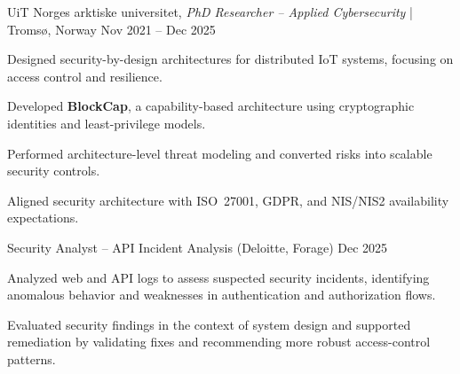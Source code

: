 


\begin{cventries2}

\cventry
  {UiT Norges arktiske universitet, \textnormal{\textit{PhD Researcher – Applied Cybersecurity} | Tromsø, Norway}}
  {Nov 2021 -- Dec 2025}
  {
    \begin{cvitems}
      \item {Designed security-by-design architectures for distributed IoT systems, focusing on access control and resilience.}
      \item {Developed \textbf{BlockCap}, a capability-based architecture using cryptographic identities and least-privilege models.}
      \item {Performed architecture-level threat modeling and converted risks into scalable security controls.}
      \item {Aligned security architecture with ISO~27001, GDPR, and NIS/NIS2 availability expectations.}
    \end{cvitems}
  }
    \vspace{3mm}

  \cventry
    {Security Analyst – API Incident Analysis (Deloitte, Forage)}
    {Dec 2025}
    {
      \begin{cvitems}
        \item {Analyzed web and API logs to assess suspected security incidents, identifying anomalous behavior and weaknesses in authentication and authorization flows.}
        \item {Evaluated security findings in the context of system design and supported remediation by validating fixes and recommending more robust access-control patterns.}
      \end{cvitems}
    }
    \vspace{3mm}


\end{cventries2}
